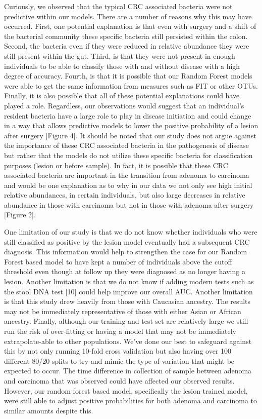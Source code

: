 \documentclass[12pt,]{article}
\begin{document}
Curiously, we observed that the typical CRC associated bacteria were not
predictive within our models. There are a number of reasons why this may
have occurred. First, one potential explanation is that even with
surgery and a shift of the bacterial community these specific bacteria
still persisted within the colon. Second, the bacteria even if they were
reduced in relative abundance they were still present within the gut.
Third, is that they were not present in enough individuals to be able to
classify those with and without disease with a high degree of accuracy.
Fourth, is that it is possible that our Random Forest models were able
to get the same information from measures such as FIT or other OTUs.
Finally, it is also possible that all of these potential explanations
could have played a role. Regardless, our observations would suggest
that an individual's resident bacteria have a large role to play in
disease initiation and could change in a way that allows predictive
models to lower the positive probability of a lesion after surgery
{[}Figure 4{]}. It should be noted that our study does not argue against
the importance of these CRC associated bacteria in the pathogenesis of
disease but rather that the models do not utilize these specific
bacteria for classification purposes (lesion or before sample). In fact,
it is possible that these CRC associated bacteria are important in the
transition from adenoma to carcinoma and would be one explanation as to
why in our data we not only see high initial relative abundances, in
certain individuals, but also large decreases in relative abundance in
those with carcinoma but not in those with adenoma after surgery
{[}Figure 2{]}.

One limitation of our study is that we do not know whether individuals
who were still classified as positive by the lesion model eventually had
a subsequent CRC diagnosis. This information would help to strengthen
the case for our Random Forest based model to have kept a number of
individuals above the cutoff threshold even though at follow up they
were diagnosed as no longer having a lesion. Another limitation is that
we do not know if adding modern tests such as the stool DNA test
{[}10{]} could help improve our overall AUC. Another limitation is that
this study drew heavily from those with Caucasian ancestry. The results
may not be immediately representative of those with either Asian or
African ancestry. Finally, although our training and test set are
relatively large we still run the risk of over-fitting or having a model
that may not be immediately extrapolate-able to other populations. We've
done our best to safeguard against this by not only running 10-fold
cross validation but also having over 100 different 80/20 splits to try
and mimic the type of variation that might be expected to occur. The
time difference in collection of sample between adenoma and carcinoma
that was observed could have affected our observed results. However, our
random forest based model, specifically the lesion trained model, were
still able to adjust positive probabilities for both adenoma and
carcinoma to similar amounts despite this.
\end{document}
